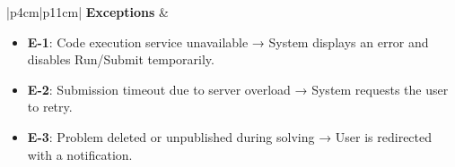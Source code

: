 \begin{table}[H]
\begin{tabular}{|p{4cm}|p{11cm}|}
\textbf{Exceptions} &
\begin{minipage}[t]{\linewidth}
\begin{itemize}[nosep, leftmargin=*]
\setlength\itemsep{0pt}
\setlength\topsep{0pt}
\setlength\partopsep{0pt}
\setlength\parsep{0pt}
    \item \textbf{E-1}: Code execution service unavailable → System displays an error and disables Run/Submit temporarily.
    \item \textbf{E-2}: Submission timeout due to server overload → System requests the user to retry.
    \item \textbf{E-3}: Problem deleted or unpublished during solving → User is redirected with a notification.
\end{itemize}
\end{minipage}
\\ \hline

\end{tabular}
\caption{UC-5: Solving a Problem}
\end{table}
